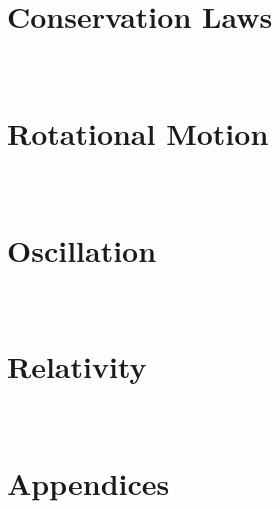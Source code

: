 \documentclass[english,twoside]{labmanual} %
\begin{document}
\part{Conservation Laws}
\











\part{Rotational Motion}
\






\part{Oscillation}
\




\part{Relativity}
\



\part{Appendices}
\
\appendix




%


\end{document}
